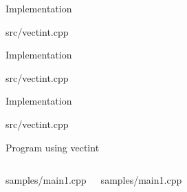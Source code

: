 \begin{frame}[t]{Implementation}
\begin{block}{src/vectint.cpp}

\end{block}
\end{frame}

\begin{frame}[t]{Implementation}
\begin{block}{src/vectint.cpp}

\end{block}
\end{frame}

\begin{frame}[t]{Implementation}
\begin{block}{src/vectint.cpp}

\end{block}
\end{frame}

\begin{frame}[t]{Program using vectint}
\begin{columns}[T]

\begin{block}{samples/main1.cpp}

\end{block}

\begin{block}{samples/main1.cpp}

\end{block}

\end{columns}
\end{frame}



